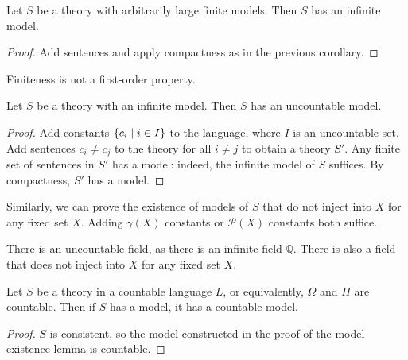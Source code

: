 \begin{corollary}
    Let \( S \) be a theory with arbitrarily large finite models.
    Then \( S \) has an infinite model.
\end{corollary}
\begin{proof}
    Add sentences and apply compactness as in the previous corollary.
\end{proof}
Finiteness is not a first-order property.
\begin{theorem}
    Let \( S \) be a theory with an infinite model.
    Then \( S \) has an uncountable model.
\end{theorem}
\begin{proof}
    Add constants \( \qty{c_i \mid i \in I} \) to the language, where \( I \) is an uncountable set.
    Add sentences \( c_i \neq c_j \) to the theory for all \( i \neq j \) to obtain a theory \( S' \).
    Any finite set of sentences in \( S' \) has a model: indeed, the infinite model of \( S \) suffices.
    By compactness, \( S' \) has a model.
\end{proof}
\begin{remark}
    Similarly, we can prove the existence of models of \( S \) that do not inject into \( X \) for any fixed set \( X \).
    Adding \( \gamma(X) \) constants or \( \mathcal P(X) \) constants both suffice.
\end{remark}
\begin{example}
    There is an uncountable field, as there is an infinite field \( \mathbb Q \).
    There is also a field that does not inject into \( X \) for any fixed set \( X \).
\end{example}
\begin{theorem}
    Let \( S \) be a theory in a countable language \( L \), or equivalently, \( \Omega \) and \( \Pi \) are countable.
    Then if \( S \) has a model, it has a countable model.
\end{theorem}
\begin{proof}
    \( S \) is consistent, so the model constructed in the proof of the model existence lemma is countable.
\end{proof}

